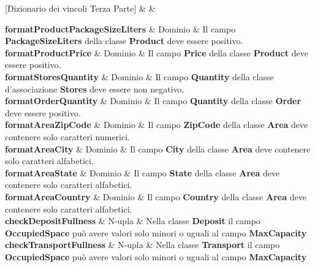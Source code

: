 [Dizionario dei vincoli Terza Parte]{ &  & }{
    
  \textbf{formatProductPackageSizeLiters} & Dominio & 
  {\footnotesize
  Il campo \textbf{PackageSizeLiters} della classe \textbf{Product} deve essere positivo.
  }\\ 

  \textbf{formatProductPrice} & Dominio & 
  {\footnotesize
  Il campo \textbf{Price} della classe \textbf{Product} deve essere positivo.
  }\\

  \textbf{formatStoresQuantity} & Dominio & 
  {\footnotesize
  Il campo \textbf{Quantity} della classe d'associazione \textbf{Stores} deve essere non negativo.
  }\\ %

  \textbf{formatOrderQuantity} & Dominio & 
  {\footnotesize
  Il campo \textbf{Quantity} della classe \textbf{Order} deve essere positivo.
  }\\

  \textbf{formatAreaZipCode} & Dominio & 
  {\footnotesize
  Il campo \textbf{ZipCode} della classe \textbf{Area} deve contenere solo caratteri numerici.
  }\\

  \textbf{formatAreaCity} & Dominio & 
  {\footnotesize
  Il campo \textbf{City} della classe \textbf{Area} deve contenere solo caratteri alfabetici.
  }\\
  
  \textbf{formatAreaState} & Dominio & 
  {\footnotesize
  Il campo \textbf{State} della classe \textbf{Area} deve contenere solo caratteri alfabetici.
  }\\
  
  \textbf{formatAreaCountry} & Dominio & 
  {\footnotesize
  Il campo \textbf{Country} della classe \textbf{Area} deve contenere solo caratteri alfabetici.
  }\\
  
  \textbf{checkDepositFullness} & N-upla & 
  {\footnotesize
  Nella classe \textbf{Deposit} il campo \textbf{OccupiedSpace} può avere valori solo minori o uguali al campo \textbf{MaxCapacity}
  }\\
  
  \textbf{checkTransportFullness} & N-upla & 
  {\footnotesize
  Nella classe \textbf{Transport} il campo \textbf{OccupiedSpace} può avere valori solo minori o uguali al campo \textbf{MaxCapacity}
  }\\
  
}
